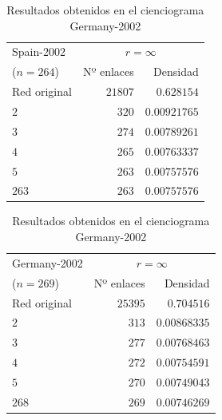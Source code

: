 \documentclass[10pt,a4paper,spanish]{article}
\numberwithin{equation}{section} %
\numberwithin{figure}{section} %
\numberwithin{table}{section} %
\begin{document}
\begin{table}[!h]
\begin{minipage}{0.5\textwidth}
\centering
\begin{tabular}{lrr}
\hline
 Spain-2002 & \multicolumn{2}{c}{$r = \infty$} \\
($n=264$)   &   Nº enlaces &    Densidad \\
\hline
 Red original             &               $21807$ & $0.628154$ \\
 $2$                        &                 $320$ & $0.00921765$  \\
 $3$                        &                 $274$ & $0.00789261$  \\
 $4$                        &                 $265$ & $0.00763337$  \\
 $5$                        &                 $263$ & $0.00757576$  \\
 $263$                      &                 $263$ & $0.00757576$  \\
\hline
\end{tabular}
\caption{Resultados obtenidos en el cienciograma Spain-2002}
\label{spain2002}
\end{minipage}
\begin{minipage}{0.5\textwidth}
\centering
\begin{tabular}{lrr}
\hline
 Germany-2002 & \multicolumn{2}{c}{$r = \infty$} \\
($n=269$)   &   Nº enlaces &    Densidad \\
\hline
 Red original               &               $25395$ & $0.704516$ \\
 $2$                          &                 $313$ & $0.00868335$  \\
 $3$                          &                 $277$ & $0.00768463$  \\
 $4$                          &                 $272$ & $0.00754591$  \\
 $5$                          &                 $270$ & $0.00749043$  \\
 $268$                        &                 $269$ & $0.00746269$  \\
\hline
\end{tabular}
\caption{Resultados obtenidos en el cienciograma Germany-2002}
\label{germany2002}
\end{minipage}
\end{table}
\end{document}
